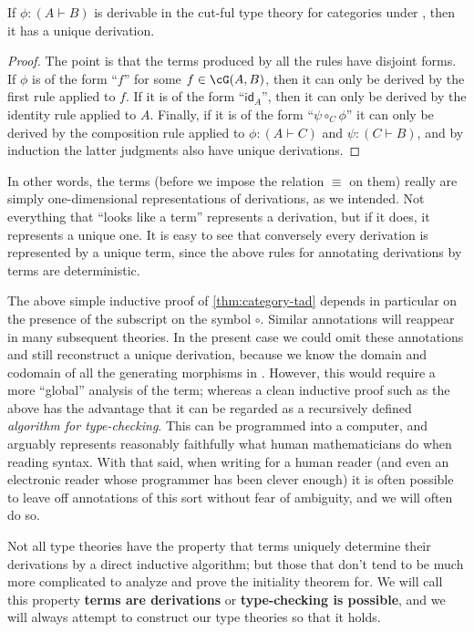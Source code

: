 \documentclass{book}
\def\idfunc{\mathsf{id}}
\let\types\vdash
\def\comp#1{\circ_{#1}}
\begin{document}
\begin{lem}\label{thm:category-tad}
  If $\phi :(A\types B)$ is derivable in the cut-ful type theory for categories under \cG, then it has a unique derivation.
\end{lem}
\begin{proof}
  The point is that the terms produced by all the rules have disjoint forms.
  If $\phi$ is of the form ``$f$'' for some $f\in\cG(A,B)$, then it can only be derived by the first rule applied to $f$.
  If it is of the form ``$\idfunc_A$'', then it can only be derived by the identity rule applied to $A$.
  Finally, if it is of the form ``$\psi\comp{C}\phi$'' it can only be derived by the composition rule applied to $\phi:(A\types C)$ and $\psi:(C\types B)$, and by induction the latter judgments also have unique derivations.
\end{proof}

In other words, the terms (before we impose the relation $\equiv$ on them) really are simply one-dimensional representations of derivations, as we intended.
Not everything that ``looks like a term'' represents a derivation, but if it does, it represents a unique one.
It is easy to see that conversely every derivation is represented by a unique term, since the above rules for annotating derivations by terms are deterministic.

The above simple inductive proof of \cref{thm:category-tad} depends in particular on the presence of the subscript on the symbol $\circ$.
Similar annotations will reappear in many subsequent theories.
In the present case we could omit these annotations and still reconstruct a unique derivation, because we know the domain and codomain of all the generating morphisms in \cG.
However, this would require a more ``global'' analysis of the term; whereas a clean inductive proof such as the above has the advantage that it can be regarded as a recursively defined \emph{algorithm for type-checking}.
This can be programmed into a computer, and arguably represents reasonably faithfully what human mathematicians do when reading syntax.
With that said, when writing for a human reader (and even an electronic reader whose programmer has been clever enough) it is often possible to leave off annotations of this sort without fear of ambiguity, and we will often do so.

Not all type theories have the property that terms uniquely determine their derivations by a direct inductive algorithm; but those that don't tend to be much more complicated to analyze and prove the initiality theorem for.
We will call this property \textbf{terms are derivations} or \textbf{type-checking is possible}, and we will always attempt to construct our type theories so that it holds.
\end{document}
